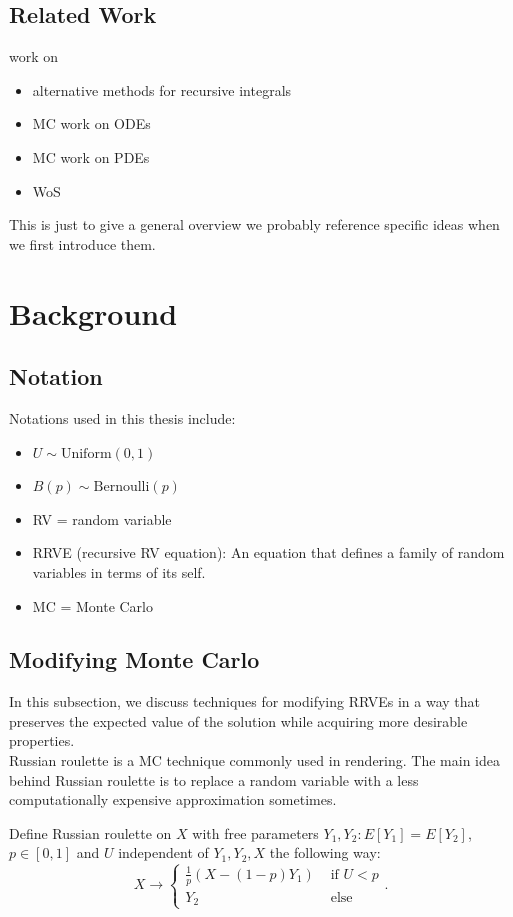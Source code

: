 \documentclass[a4paper,12pt]{article}
\begin{document}
\subsection{Related Work}
work on
\begin{itemize}
    \item alternative methods for recursive integrals
    \item MC work on ODEs
    \item MC work on PDEs
    \item WoS
\end{itemize}
This is just to give a general overview we probably reference specific ideas when we first introduce them.

\section{Background}

\subsection{Notation}
Notations used in this thesis include:

\begin{itemize}
    \item $U \sim \text{Uniform}(0,1)$
    \item $B(p) \sim \text{Bernoulli}(p)$
    \item RV = random variable
    \item RRVE (recursive RV equation): An equation that defines a
          family of random variables in terms of its self.
    \item MC = Monte Carlo
\end{itemize}


\subsection{Modifying Monte Carlo}
In this subsection, we discuss techniques for modifying RRVEs
in a way that preserves the expected value of the solution while
acquiring more desirable properties. \\

Russian roulette is a MC technique commonly used in rendering.
The main idea behind Russian roulette is to replace a random variable
with a less computationally expensive approximation sometimes.

\begin{definition} \label{Russian roulette}
    Define Russian roulette on $X$ with free parameters
    $Y_{1},Y_{2}: E[Y_{1}] = E[Y_{2}]$, $p \in [0,1]$ and $U$
    independent of $Y_{1},Y_{2},X$ the following way:
    \[
        X \rightarrow \begin{cases}
            \frac{1}{p}(X- (1-p)Y_{1}) & \text{ if } U<p \\
            Y_{2}                      & \text{ else }
        \end{cases}
        .\]
\end{definition}
\end{document}
